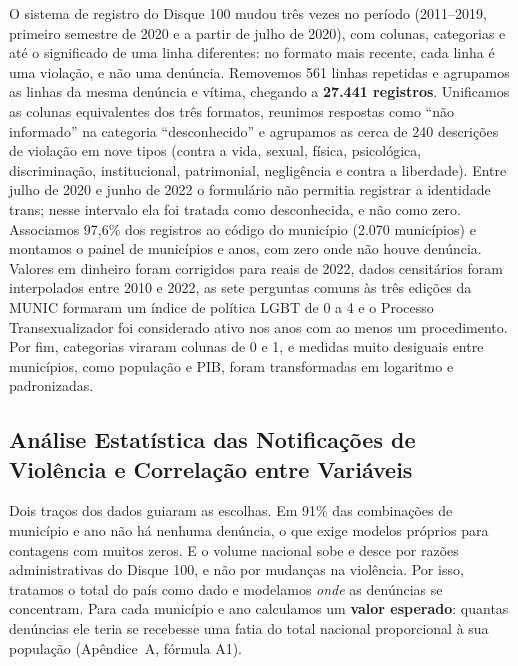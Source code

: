 \documentclass[12pt]{article}
\begin{document}
O sistema de registro do Disque 100 mudou três vezes no período (2011--2019, primeiro semestre de 2020 e a partir de julho de 2020), com colunas, categorias e até o significado de uma linha diferentes: no formato mais recente, cada linha é uma violação, e não uma denúncia. Removemos 561 linhas repetidas e agrupamos as linhas da mesma denúncia e vítima, chegando a \textbf{27.441 registros}. Unificamos as colunas equivalentes dos três formatos, reunimos respostas como ``não informado'' na categoria ``desconhecido'' e agrupamos as cerca de 240 descrições de violação em nove tipos (contra a vida, sexual, física, psicológica, discriminação, institucional, patrimonial, negligência e contra a liberdade). Entre julho de 2020 e junho de 2022 o formulário não permitia registrar a identidade trans; nesse intervalo ela foi tratada como desconhecida, e não como zero. Associamos 97,6\% dos registros ao código do município (2.070 municípios) e montamos o painel de municípios e anos, com zero onde não houve denúncia. Valores em dinheiro foram corrigidos para reais de 2022, dados censitários foram interpolados entre 2010 e 2022, as sete perguntas comuns às três edições da MUNIC formaram um índice de política LGBT de 0 a 4 e o Processo Transexualizador foi considerado ativo nos anos com ao menos um procedimento. Por fim, categorias viraram colunas de 0 e 1, e medidas muito desiguais entre municípios, como população e PIB, foram transformadas em logaritmo e padronizadas.

\subsection{Análise Estatística das Notificações de Violência e Correlação entre Variáveis}

Dois traços dos dados guiaram as escolhas. Em 91\% das combinações de município e ano não há nenhuma denúncia, o que exige modelos próprios para contagens com muitos zeros. E o volume nacional sobe e desce por razões administrativas do Disque 100, e não por mudanças na violência. Por isso, tratamos o total do país como dado e modelamos \textit{onde} as denúncias se concentram. Para cada município e ano calculamos um \textbf{valor esperado}: quantas denúncias ele teria se recebesse uma fatia do total nacional proporcional à sua população (Apêndice~A, fórmula A1).
\end{document}
